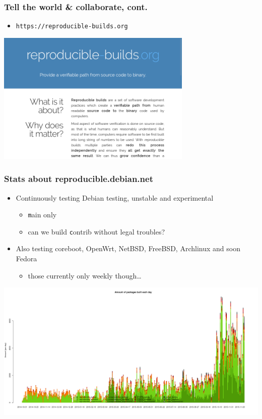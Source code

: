\documentclass[14pt]{beamer}
\begin{document}
\begin{frame}
 \frametitle{Tell the world \& collaborate, cont.}

 \begin{itemize}
  \item \texttt{https://reproducible-builds.org}
 \end{itemize}
 \begin{center}
 \includegraphics[width=0.7\textwidth]{images/rbwww1.png}
 \end{center}
\end{frame}

\begin{frame}
 \frametitle{Stats about reproducible.debian.net}

 \begin{itemize}
  \item Continuously testing Debian testing, unstable and experimental
   \begin{itemize}
    \item \small{ \texttt main only }
    \item \small{ can we build \texttt contrib without legal troubles? }
   \end{itemize}
  \item Also testing coreboot, OpenWrt, NetBSD, FreeBSD,
  Archlinux and soon Fedora
   \begin{itemize}
    \item \small{ those currently only weekly though… }
   \end{itemize}
 \end{itemize}
 \vfill
 \begin{center}
  \includegraphics[height=0.47\paperheight]{images/stats_builds_per_day_amd64.png}
 \end{center}
\end{frame}
\end{document}
